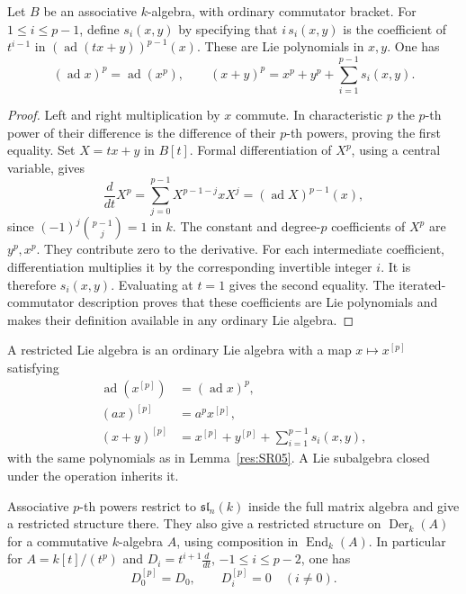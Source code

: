 \begin{lemma}
\label{res:SR05}
Let \(B\) be an associative \(k\)-algebra, with ordinary
commutator bracket. For \(1\le i\le p-1\), define
\(s_i(x,y)\) by specifying that \(i\,s_i(x,y)\) is the
coefficient of \(t^{i-1}\) in
\((\operatorname{ad}(t x+y))^{p-1}(x)\).
These are Lie polynomials in \(x,y\). One has
\[
 (\operatorname{ad}x)^p=\operatorname{ad}(x^p),\qquad
 (x+y)^p=x^p+y^p+\sum_{i=1}^{p-1}s_i(x,y).
\]
\end{lemma}

\begin{proof}
Left and right multiplication by \(x\) commute.
In characteristic \(p\) the \(p\)-th power of their
difference is the difference of their \(p\)-th powers,
proving the first equality. Set \(X=t x+y\) in \(B[t]\).
Formal differentiation of \(X^p\), using a central variable,
gives
\[
 \frac{d}{dt}X^p=\sum_{j=0}^{p-1}X^{p-1-j}xX^j
          =(\operatorname{ad}X)^{p-1}(x),
\]
since \((-1)^j\binom{p-1}{j}=1\) in \(k\).
The constant and degree-\(p\) coefficients of \(X^p\)
are \(y^p,x^p\). They contribute zero to the derivative.
For each intermediate coefficient, differentiation
multiplies it by the corresponding invertible integer \(i\).
It is therefore \(s_i(x,y)\). Evaluating at \(t=1\)
gives the second equality. The iterated-commutator
description proves that these coefficients are Lie
polynomials and makes their definition available in any
ordinary Lie algebra.
\end{proof}

\begin{definition}
\label{res:SR06}
A restricted Lie algebra is an ordinary Lie algebra with a map
\(x\mapsto x^{[p]}\) satisfying
\[
\begin{aligned}
\operatorname{ad}(x^{[p]})&=(\operatorname{ad}x)^p,\\
(a x)^{[p]}&=a^p x^{[p]},\\
(x+y)^{[p]}&=x^{[p]}+y^{[p]}+\sum_{i=1}^{p-1}s_i(x,y),
\end{aligned}
\]
with the same polynomials as in Lemma~\ref{res:SR05}.
A Lie subalgebra closed under the operation inherits it.
\end{definition}

\begin{proposition}
\label{res:SR07}
Associative \(p\)-th powers restrict to \(\mathfrak{sl}_n(k)\)
inside the full matrix algebra and give a restricted
structure there. They also give a restricted structure on
\(\operatorname{Der}_k(A)\) for a commutative \(k\)-algebra \(A\),
using composition in \(\operatorname{End}_k(A)\).
In particular for \(A=k[t]/(t^p)\) and
\(D_i=t^{i+1}\frac{d}{dt}\), \(-1\le i\le p-2\), one has
\[
 D_0^{[p]}=D_0,\qquad D_i^{[p]}=0\quad(i\ne0).
\]
\end{proposition}

